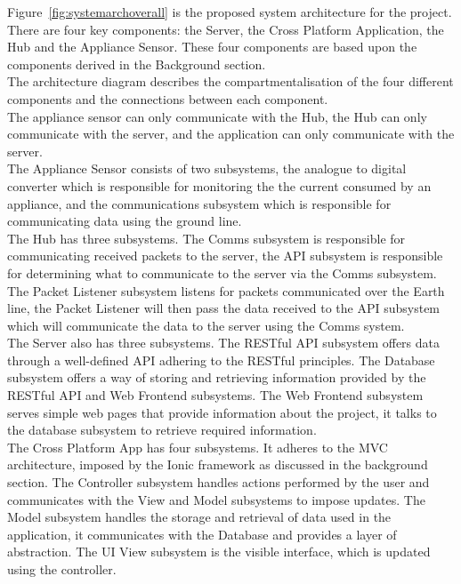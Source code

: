 \documentclass[preprint,12pt,3p]{elsarticle}
\begin{document}
Figure~\ref{fig:systemarchoverall} is the proposed system architecture for the project.\\
There are four key components: the Server, the Cross Platform Application, the Hub and the Appliance Sensor. These four components are based upon the components derived in the Background section.\\
The architecture diagram describes the compartmentalisation of the four different components and the connections between each component.\\
The appliance sensor can only communicate with the Hub, the Hub can only communicate with the server, and the application can only communicate with the server.\\
The Appliance Sensor consists of two subsystems, the analogue to digital converter which is responsible for monitoring the the current consumed by an appliance, and the communications subsystem which is responsible for communicating data using the ground line.\\
The Hub has three subsystems. The Comms subsystem is responsible for communicating received packets to the server, the API subsystem is responsible for determining what to communicate to the server via the Comms subsystem. The Packet Listener subsystem listens for packets communicated over the Earth line, the Packet Listener will then pass the data received to the API subsystem which will communicate the data to the server using the Comms system.\\
The Server also has three subsystems. The RESTful API subsystem offers data through a well-defined API adhering to the RESTful principles. The Database subsystem offers a way of storing and retrieving information provided by the RESTful API and Web Frontend subsystems. The Web Frontend subsystem serves simple web pages that provide information about the project, it talks to the database subsystem to retrieve required information.\\
The Cross Platform App has four subsystems. It adheres to the MVC architecture, imposed by the Ionic framework as discussed in the background section. The Controller subsystem handles actions performed by the user and communicates with the View and Model subsystems to impose updates. The Model subsystem handles the storage and retrieval of data used in the application, it communicates with the Database and provides a layer of abstraction. The UI View subsystem is the visible interface, which is updated using the controller. 


\clearpage
\end{document}
